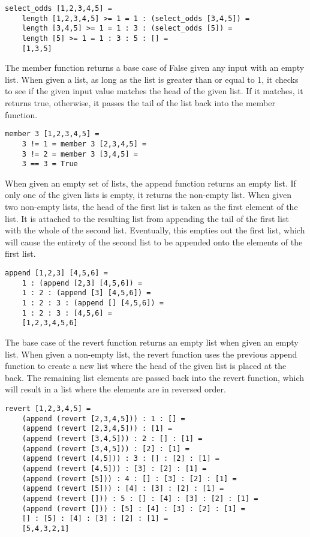 \documentclass{article}
\theoremstyle{theorem}
\theoremstyle{definition}
\theoremstyle{remark}
\begin{document}
\begin{lstlisting}
select_odds [1,2,3,4,5] =
	length [1,2,3,4,5] >= 1 = 1 : (select_odds [3,4,5]) =
	length [3,4,5] >= 1 = 1 : 3 : (select_odds [5]) =
	length [5] >= 1 = 1 : 3 : 5 : [] =
	[1,3,5]
\end{lstlisting}

\medskip\noindent
The member function returns a base case of False given any input with an empty list. When given a list, as long as the list is greater than or equal to 1, it checks to see if the given input value matches the head of the given list. If it matches, it returns true, otherwise, it passes the tail of the list back into the member function.

\begin{lstlisting}
member 3 [1,2,3,4,5] =
	3 != 1 = member 3 [2,3,4,5] =
	3 != 2 = member 3 [3,4,5] =
	3 == 3 = True
\end{lstlisting}

\medskip\noindent
When given an empty set of lists, the append function returns an empty list. If only one of the given lists is empty, it returns the non-empty list. When given two non-empty lists, the head of the first list is taken as the first element of the list. It is attached to the resulting list from appending the tail of the first list with the whole of the second list. Eventually, this empties out the first list, which will cause the entirety of the second list to be appended onto the elements of the first list.

\begin{lstlisting}
append [1,2,3] [4,5,6] =
	1 : (append [2,3] [4,5,6]) =
	1 : 2 : (append [3] [4,5,6]) =
	1 : 2 : 3 : (append [] [4,5,6]) =
	1 : 2 : 3 : [4,5,6] =
	[1,2,3,4,5,6]
\end{lstlisting}

\medskip\noindent
The base case of the revert function returns an empty list when given an empty list. When given a non-empty list, the revert function uses the previous append function to create a new list where the head of the given list is placed at the back. The remaining list elements are passed back into the revert function, which will result in a list where the elements are in reversed order.

\begin{lstlisting}
revert [1,2,3,4,5] =
	(append (revert [2,3,4,5])) : 1 : [] =
	(append (revert [2,3,4,5])) : [1] =
	(append (revert [3,4,5])) : 2 : [] : [1] =
	(append (revert [3,4,5])) : [2] : [1] =
	(append (revert [4,5])) : 3 : [] : [2] : [1] =
	(append (revert [4,5])) : [3] : [2] : [1] =
	(append (revert [5])) : 4 : [] : [3] : [2] : [1] =
	(append (revert [5])) : [4] : [3] : [2] : [1] =
	(append (revert [])) : 5 : [] : [4] : [3] : [2] : [1] =
	(append (revert [])) : [5] : [4] : [3] : [2] : [1] =
	[] : [5] : [4] : [3] : [2] : [1] =
	[5,4,3,2,1]
\end{lstlisting}
\end{document}
